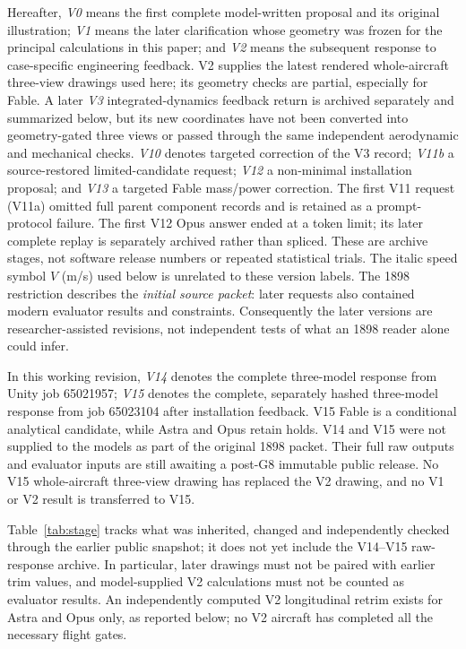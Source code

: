 \documentclass[10pt,letterpaper]{article}
\begin{document}
Hereafter, \emph{V0} means the first complete model-written proposal and its original illustration; \emph{V1} means the later clarification whose geometry was frozen for the principal calculations in this paper; and \emph{V2} means the subsequent response to case-specific engineering feedback. V2 supplies the latest rendered whole-aircraft three-view drawings used here; its geometry checks are partial, especially for Fable. A later \emph{V3} integrated-dynamics feedback return is archived separately and summarized below, but its new coordinates have not been converted into geometry-gated three views or passed through the same independent aerodynamic and mechanical checks. \emph{V10} denotes targeted correction of the V3 record; \emph{V11b} a source-restored limited-candidate request; \emph{V12} a non-minimal installation proposal; and \emph{V13} a targeted Fable mass/power correction. The first V11 request (V11a) omitted full parent component records and is retained as a prompt-protocol failure. The first V12 Opus answer ended at a token limit; its later complete replay is separately archived rather than spliced. These are archive stages, not software release numbers or repeated statistical trials. The italic speed symbol $V$ (m/s) used below is unrelated to these version labels. The 1898 restriction describes the \emph{initial source packet}: later requests also contained modern evaluator results and constraints. Consequently the later versions are researcher-assisted revisions, not independent tests of what an 1898 reader alone could infer.

In this working revision, \emph{V14} denotes the complete three-model response from Unity job 65021957; \emph{V15} denotes the complete, separately hashed three-model response from job 65023104 after installation feedback. V15 Fable is a conditional analytical candidate, while Astra and Opus retain holds. V14 and V15 were not supplied to the models as part of the original 1898 packet. Their full raw outputs and evaluator inputs are still awaiting a post-G8 immutable public release. No V15 whole-aircraft three-view drawing has replaced the V2 drawing, and no V1 or V2 result is transferred to V15.

Table~\ref{tab:stage} tracks what was inherited, changed and independently checked through the earlier public snapshot; it does not yet include the V14--V15 raw-response archive. In particular, later drawings must not be paired with earlier trim values, and model-supplied V2 calculations must not be counted as evaluator results. An independently computed V2 longitudinal retrim exists for Astra and Opus only, as reported below; no V2 aircraft has completed all the necessary flight gates.
\end{document}
